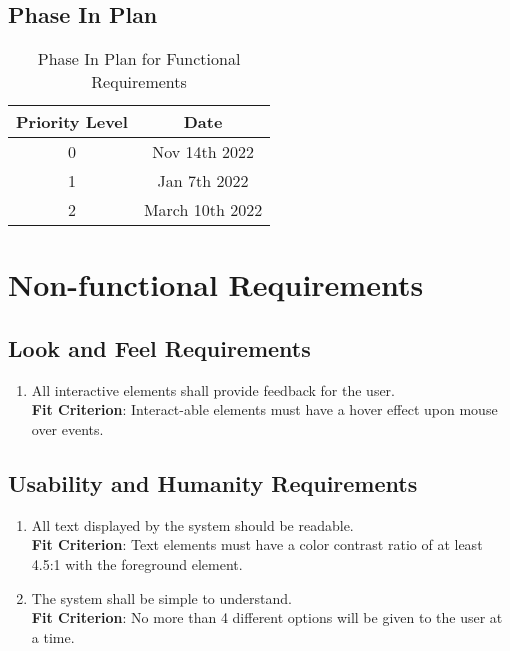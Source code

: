\documentclass[12pt, titlepage]{article}
\begin{document}
\subsection{Phase In Plan}
\begin{table}[h]
\begin{center}
\begin{tabular}{|c|c|}
\hline
    Priority Level & Date \\
    \hline
    0 & Nov 14th 2022 \\
    1 & Jan 7th 2022 \\
    2 & March 10th 2022 \\
    \hline
\end{tabular}
\end{center}
\caption{Phase In Plan for Functional Requirements}            

\end{table}


\section{Non-functional Requirements}

\subsection{Look and Feel Requirements}
\begin{enumerate}[label=NFR.\arabic*]
    \item All interactive elements shall provide feedback for the user. \label{NFR.1}
    \\\textbf{Fit Criterion}: Interact-able elements must have a hover effect upon mouse over events.
\end{enumerate}

\subsection{Usability and Humanity Requirements}
\begin{enumerate}[label=NFR.\arabic*, resume]
    \item All text displayed by the system should be readable.
    \\\textbf{Fit Criterion}: Text elements must have a color contrast ratio of at least 4.5:1 with the foreground element.
    \label{NFR.2}
    \item The system shall be simple to understand. \label{NFR.3}
    \\\textbf{Fit Criterion}: No more than 4 different options will be given to the user at a time.
\end{enumerate}
\end{document}
